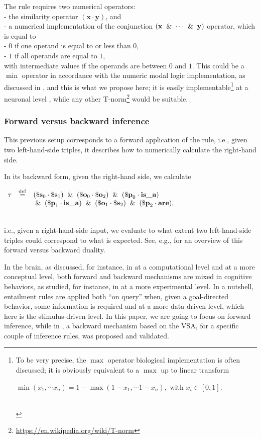 \documentclass[sn-mathphys]{sn-jnl}
\newcommand{\defq}{\stackrel {\rm def}{=}}
\newcommand{\tab}{\hphantom{~}}
\newcommand{\eqline}[1]{~\vspace{0.1cm}\\\centerline{$#1$}\vspace{0.1cm}\\}
\begin{document}
The rule requires two numerical operators:
\\- the similarity operator $(\mathbf{x} \cdot \mathbf{y})$, and
\\ - a numerical implementation of the conjunction $(\mathbf{x} \And \cdots \And \mathbf{y})$ operator, which is equal to
\\ \tab \tab - $0$ if one operand is equal to or less than $0$, 
\\ \tab \tab - $1$ if all operands are equal to $1$,
\\ with intermediate values if the operands are between $0$ and $1$.
This could be a $\min$ operator in accordance with the numeric modal logic implementation, as discussed in \cite{vieville_representation_2022}, and this is what we propose here; it is easily implementable\footnote{To be very precise, the $\max$ operator biological implementation is often discussed; it is obviously equivalent to a $\max$ up to linear transform
\eqline{\min(x_1, \cdots x_n) = 1 - \max(1 - x_1, \cdots 1 - x_n), \mbox{ with } x_i \in [0, 1].}} at a neuronal level \cite{bugmann_biologically_1997}, while any other T-norm\footnote{\url{https://en.wikipedia.org/wiki/T-norm}} would be suitable.

\subsubsection{Forward versus backward inference}

This previous setup corresponds to a forward application of the rule, i.e., given two left-hand-side triples, it describes how to numerically calculate the right-hand side.

In its backward form, given the right-hand side, we calculate
\eqline{\begin{array}{rcl}\tau &\defq&  (\mathbf{\$s}_0 \cdot \mathbf{\$s}_1) \And (\mathbf{\$o}_0 \cdot \mathbf{\$o}_2) \And (\mathbf{\$p}_0 \cdot \texttt{\bf is\_a}) \\&& \And (\mathbf{\$p}_1 \cdot \texttt{\bf is\_a}) \And (\mathbf{\$o}_1 \cdot \mathbf{\$s}_2) \And (\mathbf{\$p}_2 \cdot \texttt{\bf are}),\end{array}}
i.e., given a right-hand-side input, we evaluate to what extent two left-hand-side triples could correspond to what is expected. See, e.g., \cite{kapoor_comparative_2016} for an overview of this forward versus backward duality.

In the brain, as discussed, for instance, in \cite{oreilly_goal-driven_2014} at a computational level and \cite{friston_learning_2003} at a more conceptual level, both forward and backward mechanisms are mixed in cognitive behaviors, as studied, for instance, in \cite{amidu_protocol_2019} at a more experimental level. In a nutshell, entailment rules are applied both ``on query'' when, given a goal-directed behavior, some information is required and at a more data-driven level, which here is the stimulus-driven level. In this paper, we are going to focus on forward inference, while in \cite{mercier_ontology_2021}, a backward mechanism based on the VSA, for a specific couple of inference rules, was proposed and validated.
\end{document}

